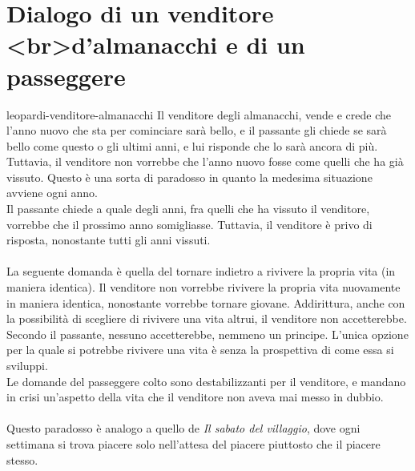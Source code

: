 \documentclass[preview]{standalone}
\begin{document}
\genpage

\section{Dialogo di un venditore <br>d'almanacchi e di un passeggere}


\begin{snippet}{leopardi-venditore-almanacchi}
    Il venditore degli almanacchi, vende e crede che l'anno nuovo che sta per cominciare
    sarà bello, e il passante gli chiede se sarà bello come questo o gli ultimi anni, e
    lui risponde che lo sarà ancora di più. Tuttavia, il venditore non vorrebbe
    che l'anno nuovo fosse come quelli che ha già vissuto.
    Questo è una sorta di paradosso in quanto la medesima situazione avviene
    ogni anno.
    \\
    Il passante chiede a quale degli anni, fra quelli che ha vissuto il venditore, vorrebbe
    che il prossimo anno somigliasse.
    Tuttavia, il venditore è privo di risposta, nonostante tutti gli anni vissuti.
    \\\\
    La seguente domanda è quella del tornare indietro a rivivere la propria vita (in maniera identica).
    Il venditore non vorrebbe rivivere la propria vita nuovamente in maniera identica,
    nonostante vorrebbe tornare giovane.
    Addirittura, anche con la possibilità di scegliere di rivivere una vita altrui, il venditore
    non accetterebbe.
    Secondo il passante, nessuno accetterebbe, nemmeno un principe.
    L'unica opzione per la quale si potrebbe rivivere una vita è senza la prospettiva di come
    essa si sviluppi.
    \\
    Le domande del passeggere colto sono destabilizzanti per il venditore, e mandano in crisi
    un'aspetto della vita che il venditore non aveva mai messo in dubbio.
    \\\\
    Questo paradosso è analogo a quello de \textit{Il sabato del villaggio}, 
    dove ogni settimana si trova piacere solo nell'attesa del piacere piuttosto
    che il piacere stesso.
    
\end{snippet}
\end{document}
